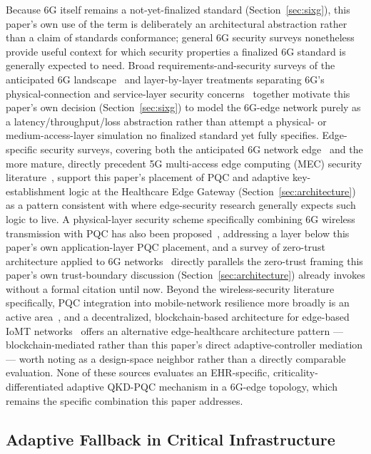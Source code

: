 \documentclass[journal]{IEEEtran}
\begin{document}
Because 6G itself remains a not-yet-finalized standard (Section~\ref{sec:sixg}), this paper's own use of the term is deliberately an architectural abstraction rather than a claim of standards conformance; general 6G security surveys nonetheless provide useful context for which security properties a finalized 6G standard is generally expected to need. Broad requirements-and-security surveys of the anticipated 6G landscape~\cite{sixgsecuritysurveyjnca2024,sixgsecprivacysurvey2021} and layer-by-layer treatments separating 6G's physical-connection and service-layer security concerns~\cite{sixgsecuritylayers2025} together motivate this paper's own decision (Section~\ref{sec:sixg}) to model the 6G-edge network purely as a latency/throughput/loss abstraction rather than attempt a physical- or medium-access-layer simulation no finalized standard yet fully specifies. Edge-specific security surveys, covering both the anticipated 6G network edge~\cite{sixgedgesecurity2023} and the more mature, directly precedent 5G multi-access edge computing (MEC) security literature~\cite{mecsecuritysurvey2021}, support this paper's placement of PQC and adaptive key-establishment logic at the Healthcare Edge Gateway (Section~\ref{sec:architecture}) as a pattern consistent with where edge-security research generally expects such logic to live. A physical-layer security scheme specifically combining 6G wireless transmission with PQC has also been proposed~\cite{pqc6gphysicallayer2024}, addressing a layer below this paper's own application-layer PQC placement, and a survey of zero-trust architecture applied to 6G networks~\cite{zerotrust6gsurvey2024} directly parallels the zero-trust framing this paper's own trust-boundary discussion (Section~\ref{sec:architecture}) already invokes without a formal citation until now. Beyond the wireless-security literature specifically, PQC integration into mobile-network resilience more broadly is an active area~\cite{pqcmobileresilience2026}, and a decentralized, blockchain-based architecture for edge-based IoMT networks~\cite{bedgehealth2021} offers an alternative edge-healthcare architecture pattern --- blockchain-mediated rather than this paper's direct adaptive-controller mediation --- worth noting as a design-space neighbor rather than a directly comparable evaluation. None of these sources evaluates an EHR-specific, criticality-differentiated adaptive QKD-PQC mechanism in a 6G-edge topology, which remains the specific combination this paper addresses.

\subsection{Adaptive Fallback in Critical Infrastructure}
\end{document}
